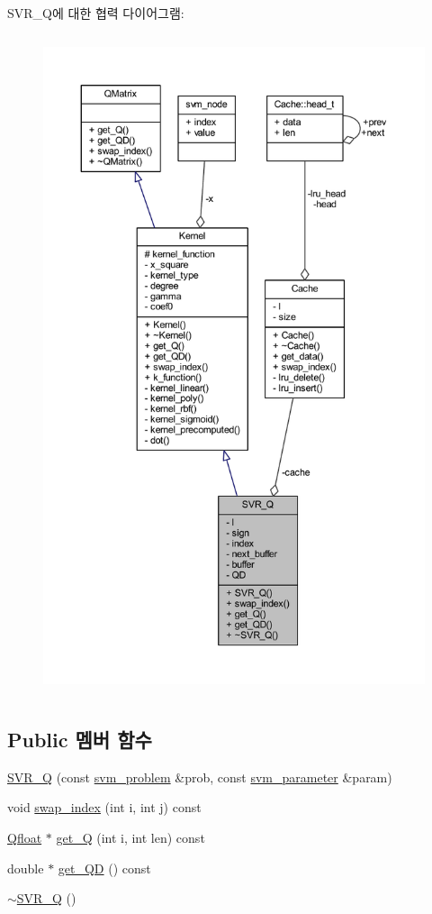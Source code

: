 S\+V\+R\+\_\+\+Q에 대한 협력 다이어그램\+:
\nopagebreak
\begin{figure}[H]
\begin{center}
\leavevmode
\includegraphics[height=550pt]{class_s_v_r___q__coll__graph}
\end{center}
\end{figure}
\subsection*{Public 멤버 함수}
\begin{DoxyCompactItemize}
\item 
\hyperlink{class_s_v_r___q_a348978e0cce4c0bf503dc825241eb4ff}{S\+V\+R\+\_\+\+Q} (const \hyperlink{structsvm__problem}{svm\+\_\+problem} \&prob, const \hyperlink{structsvm__parameter}{svm\+\_\+parameter} \&param)
\item 
void \hyperlink{class_s_v_r___q_a9d3884f0c68f4ce18d47570e4a203405}{swap\+\_\+index} (int i, int j) const 
\item 
\hyperlink{svm_8cpp_a8755d90a54ecfb8d15051af3e0542592}{Qfloat} $\ast$ \hyperlink{class_s_v_r___q_aba55078d17e7815f093ffa154f3cee9d}{get\+\_\+\+Q} (int i, int len) const 
\item 
double $\ast$ \hyperlink{class_s_v_r___q_ac22ed5ce1b0bf6a900c3c8d631e77d76}{get\+\_\+\+Q\+D} () const 
\item 
\hyperlink{class_s_v_r___q_a2a8efdc1fef68cc5bc9d0d2669d24e36}{$\sim$\+S\+V\+R\+\_\+\+Q} ()
\end{DoxyCompactItemize}
